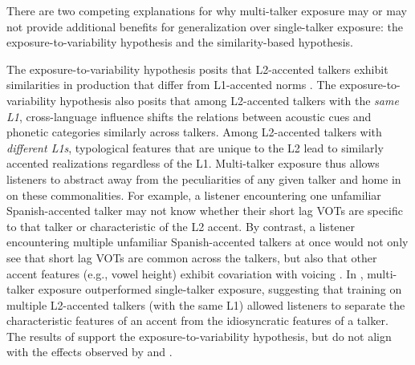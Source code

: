 \documentclass[preprint, 3p, authoryear]{elsarticle} %
\begin{document}
There are two competing explanations for why multi-talker exposure may or may not provide additional benefits for generalization over single-talker exposure: the exposure-to-variability hypothesis and the similarity-based hypothesis.

The exposure-to-variability hypothesis posits that L2-accented talkers exhibit similarities in production that differ from L1-accented norms \citep{baese2013}.
The exposure-to-variability hypothesis also posits that among L2-accented talkers with the \emph{same L1}, cross-language influence shifts the relations between acoustic cues and phonetic categories similarly across talkers.
Among L2-accented talkers with \emph{different L1s}, typological features that are unique to the L2 lead to similarly accented realizations regardless of the L1.
Multi-talker exposure thus allows listeners to abstract away from the peculiarities of any given talker and home in on these commonalities.
For example, a listener encountering one unfamiliar Spanish-accented talker may not know whether their short lag VOTs are specific to that talker or characteristic of the L2 accent.
By contrast, a listener encountering multiple unfamiliar Spanish-accented talkers at once would not only see that short lag VOTs are common across the talkers, but also that other accent features (e.g., vowel height) exhibit covariation with voicing \citep{clayards2017}.
In \citet{bradlow2008}, multi-talker exposure outperformed single-talker exposure, suggesting that training on multiple L2-accented talkers (with the same L1) allowed listeners to separate the characteristic features of an accent from the idiosyncratic features of a talker.
The results of \citet{bradlow2008} support the exposure-to-variability hypothesis, but do not align with the effects observed by \citet{xie2017similarity} and \citet{xie2021}.
\end{document}
